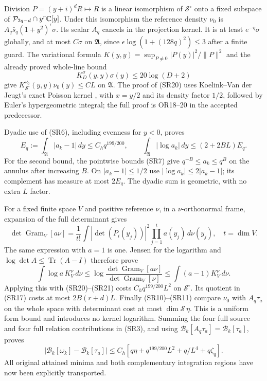 \documentclass[11pt]{article}
\newcommand{\PP}{\mathcal P}\newcommand{\BB}{\mathcal B}
\newcommand{\dd}{\,d}\newcommand{\Tr}{\operatorname{Tr}}
\newcommand{\Gram}{\operatorname{Gram}}\newcommand{\rank}{\operatorname{rank}}
\begin{document}
Division $P=(y+i)^dR\mapsto R$ is a linear isomorphism of $\mathcal S^\circ$
onto a fixed subspace of $\PP_{2q-d}\cap y^r\C[y]$. Under this isomorphism
the reference density $\nu_0$ is
$A_q\bar s_q(1+y^2)^\epsilon\sigma$. Its scalar $A_q$ cancels in the
projection kernel. It is at least $e^{-\eta}\sigma$ globally, and at most
$C\sigma$ on $\mathfrak A$, since
$\epsilon\log(1+(128q)^2)\le3$ after a finite guard.
The variational formula $K(y,y)=\sup_{P\ne0}|P(y)|^2/\|P\|^2$ and the
already proved whole-line bound
\begin{equation}\tag{SR20}
 K_D^\sigma(y,y)\sigma(y)\le20\log(D+2)
\end{equation}
give $K_{\mathcal S^\circ}^{\nu_0}(y,y)\nu_0(y)\le C L$ on $\mathfrak A$.
The proof of (SR20) uses Koelink--Van der Jeugt's exact Poisson kernel
\cite{KVJ}, with $x=y/2$ and its density factor $1/2$, followed by Euler's
hypergeometric integral; the full proof is OR18--20 in the accepted predecessor.

Dyadic use of (SR6), including evenness for $y<0$, proves
\begin{equation}\tag{SR21}
 E_q:=\int_{\mathfrak A}|a_k-1|\dd y\le C_hq^{199/200},\qquad
 \int_{\mathfrak A}|\log a_k|\dd y\le(2+2BL)E_q.
\end{equation}
For the second bound, the pointwise bounds (SR7) give
$q^{-B}\le a_k\le q^B$ on the annulus after increasing $B$.
On $|a_k-1|\le1/2$ use $|\log a_k|\le2|a_k-1|$; its complement has
measure at most $2E_q$. The dyadic sum is geometric, with no extra $L$ factor.

For a fixed finite space $V$ and positive reference $\nu$, in a
$\nu$-orthonormal frame, expansion of the full determinant gives
\[
 \det\Gram_V[a\nu]=\frac1{t!}\int
 |\det(P_i(y_j))|^2\prod_{j=1}^ta(y_j)\dd\nu(y_j),\quad t=\dim V.
\]
The same expression with $a=1$ is one. Jensen for the logarithm and
$\log\det A\le\Tr(A-I)$ therefore prove
\begin{equation}\tag{SR22}
 \int\log a\,K_V^\nu\dd\nu
 \le\log\frac{\det\Gram_V[a\nu]}{\det\Gram_V[\nu]}
 \le\int(a-1)K_V^\nu\dd\nu.
\end{equation}
Applying this with (SR20)--(SR21) costs $C_hq^{199/200}L^2$ on
$\mathcal S^\circ$. Its quotient in (SR17) costs at most $2B(r+d)L$.
Finally (SR10)--(SR11) compare $\nu_0$ with $A_q\tau_a$ on the whole space
with determinant cost at most $\dim\mathcal S\,\eta$. This is a uniform
form bound and introduces no kernel logarithm.
Summing the four full source and four full relation contributions in (SR3),
and using $\BB_k[A_q\tau_a]=\BB_k[\tau_a]$, proves
\begin{equation}\tag{SR23}
 |\BB_k[\omega_k]-\BB_k[\tau_a]|
 \le C_h\left[q\eta+q^{199/200}L^2+q/L^4+q\zeta_q\right].
\end{equation}
All original attained minima and both complementary integration regions have
now been explicitly transported.
\end{document}
